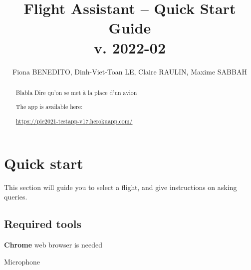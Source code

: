 \documentclass[12pt,oneside,a4]{article}
\title{Flight Assistant -- Quick Start Guide\\ \small{v. 2022-02}}
\author{Fiona \MakeUppercase{Benedito}, 
		Dinh-Viet-Toan  \MakeUppercase{Le}, 
		Claire \MakeUppercase{Raulin}, 
		Maxime \MakeUppercase{Sabbah}}
\date{}
\let\tempone\itemize
\let\temptwo\enditemize
\renewenvironment{itemize}{\tempone\addtolength{\itemsep}{-0.5\baselineskip}}{\temptwo}
\newcommand{\linkdeploy}{https://pie2021-testapp-v17.herokuapp.com/}
\begin{document}
\maketitle
\vfill
\begin{center}
\end{center}
\vfill
\begin{abstract}
Blabla
Dire qu'on se met à la place d'un avion

The app is available here:
\begin{center}
    \vspace{-.5em}
    \url{\linkdeploy}
    \vspace{-.5em}
\end{center}
\end{abstract}

\clearpage
\tableofcontents

\clearpage


\section{Quick start}

This section will guide you to select a flight, and give instructions on asking queries.

\subsection{Required tools}
\begin{itemize}
    \item \textbf{Chrome} web browser is needed
    \item Microphone
\end{itemize}
\end{document}
